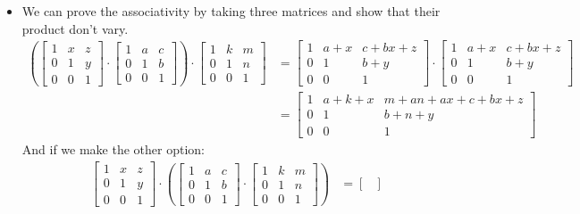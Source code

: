 \documentclass[final,expand]{problemset}
\begin{document}
{\begin{itemize}
		\item We can prove the associativity by taking three matrices and show that their product don't vary. 
		\begin{align*}
			\left(\begin{bmatrix}
				1 & x & z\\ 0 & 1 & y\\ 0 & 0 & 1
			\end{bmatrix} \cdot \begin{bmatrix}
				1 & a & c\\ 0 & 1 & b\\ 0 & 0 & 1
			\end{bmatrix}\right) \cdot \begin{bmatrix}
				1 & k & m\\ 0 & 1 & n\\ 0 & 0 & 1
			\end{bmatrix} &= \begin{bmatrix}
				1 & a +x & c + bx + z\\ 0 & 1 & b+y\\ 0 & 0 & 1
			\end{bmatrix} \cdot \begin{bmatrix}
				1 & a +x & c + bx + z\\ 0 & 1 & b+y\\ 0 & 0 & 1
			\end{bmatrix}\\
			&= \begin{bmatrix}
				1 & a + k + x& m + an +ax + c + bx + z\\
				0 & 1 & b + n + y\\
				0 & 0 & 1
			\end{bmatrix}
		\end{align*}
		And if we make the other option:
		\begin{align*}
			\begin{bmatrix}
				1 & x & z\\ 0 & 1 & y\\ 0 & 0 & 1
			\end{bmatrix} \cdot \left(\begin{bmatrix}
				1 & a & c\\ 0 & 1 & b\\ 0 & 0 & 1
			\end{bmatrix} \cdot \begin{bmatrix}
				1 & k & m\\ 0 & 1 & n\\ 0 & 0 & 1
			\end{bmatrix}\right) &= \begin{bmatrix}

\end{bmatrix}
\end{align*}
\end{itemize}}
\end{document}
